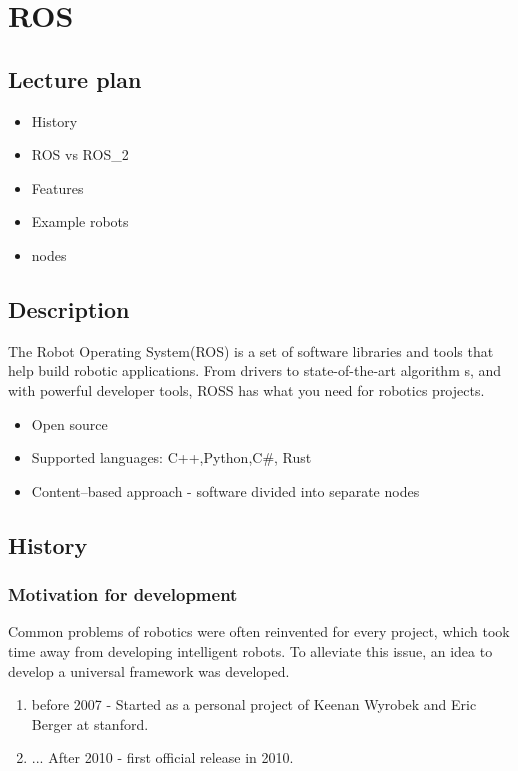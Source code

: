 
\chapter{ROS}
\section{Lecture plan}
\begin{itemize}
        \item History
        \item ROS vs ROS_2
        \item Features
        \item Example robots
        \item nodes
\end{itemize}

\section{Description}
{
    The Robot Operating System(ROS) is a set of software libraries and tools that help build robotic applications. 
    From drivers to state-of-the-art algorithm s, and with powerful developer tools, ROSS has what you need for robotics projects.
    \begin{itemize}
            \item Open source
            \item Supported languages: C++,Python,C#, Rust
            \item Content--based approach - software divided into separate nodes
            
    \end{itemize}
}
\section{History}
\subsection{Motivation for development}
Common problems of robotics were often reinvented for every project, which took time away from developing intelligent robots.
To alleviate this issue, an idea to develop a universal framework was developed.

\begin{enumerate}
    \item before 2007 - Started as a personal project of Keenan Wyrobek and Eric Berger at stanford.
    \item ... After 2010 - first official release in 2010.
\end{enumerate}
